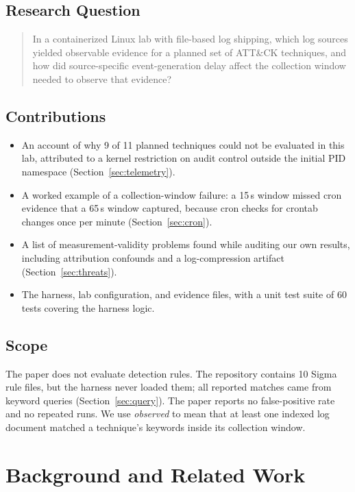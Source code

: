 \documentclass[11pt,a4paper]{article}
\begin{document}
\subsection{Research Question}

\begin{quote}
In a containerized Linux lab with file-based log shipping, which log sources
yielded observable evidence for a planned set of ATT\&CK techniques, and how
did source-specific event-generation delay affect the collection window needed
to observe that evidence?
\end{quote}

\subsection{Contributions}

\begin{itemize}
    \item An account of why 9 of 11 planned techniques could not be evaluated
    in this lab, attributed to a kernel restriction on audit control outside
    the initial PID namespace (Section~\ref{sec:telemetry}).
    \item A worked example of a collection-window failure: a 15\,s window
    missed cron evidence that a 65\,s window captured, because cron checks
    for crontab changes once per minute (Section~\ref{sec:cron}).
    \item A list of measurement-validity problems found while auditing our own
    results, including attribution confounds and a log-compression artifact
    (Section~\ref{sec:threats}).
    \item The harness, lab configuration, and evidence files, with a unit test
    suite of 60 tests covering the harness logic.
\end{itemize}

\subsection{Scope}

The paper does not evaluate detection rules. The repository contains 10 Sigma
rule files, but the harness never loaded them; all reported matches came from
keyword queries (Section~\ref{sec:query}). The paper reports no false-positive
rate and no repeated runs. We use \emph{observed} to mean that at least one
indexed log document matched a technique's keywords inside its collection
window.

\section{Background and Related Work}
\end{document}
